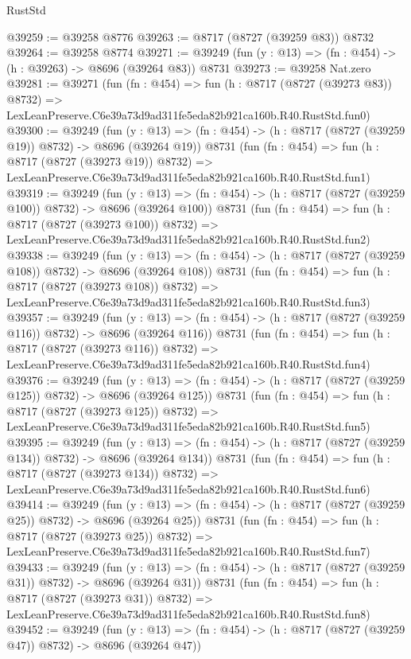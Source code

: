 \begin{lexlean}{RustStd}
\begin{coremodule}
@39259 := @39258 @8776
@39263 := @8717 (@8727 (@39259 @83)) @8732
@39264 := @39258 @8774
@39271 := @39249 (fun (y : @13) => (fn : @454) -> (h : @39263) -> @8696 (@39264 @83)) @8731
@39273 := @39258 Nat.zero
@39281 := @39271
    (fun (fn : @454) =>
    fun (h : @8717 (@8727 (@39273 @83)) @8732) =>
    LexLeanPreserve.C6e39a73d9ad311fe5eda82b921ca160b.R40.RustStd.fun0)
@39300 := @39249
    (fun (y : @13) => (fn : @454) -> (h : @8717 (@8727 (@39259 @19)) @8732) -> @8696 (@39264 @19))
    @8731
    (fun (fn : @454) =>
    fun (h : @8717 (@8727 (@39273 @19)) @8732) =>
    LexLeanPreserve.C6e39a73d9ad311fe5eda82b921ca160b.R40.RustStd.fun1)
@39319 := @39249
    (fun (y : @13) => (fn : @454) -> (h : @8717 (@8727 (@39259 @100)) @8732) -> @8696 (@39264 @100))
    @8731
    (fun (fn : @454) =>
    fun (h : @8717 (@8727 (@39273 @100)) @8732) =>
    LexLeanPreserve.C6e39a73d9ad311fe5eda82b921ca160b.R40.RustStd.fun2)
@39338 := @39249
    (fun (y : @13) => (fn : @454) -> (h : @8717 (@8727 (@39259 @108)) @8732) -> @8696 (@39264 @108))
    @8731
    (fun (fn : @454) =>
    fun (h : @8717 (@8727 (@39273 @108)) @8732) =>
    LexLeanPreserve.C6e39a73d9ad311fe5eda82b921ca160b.R40.RustStd.fun3)
@39357 := @39249
    (fun (y : @13) => (fn : @454) -> (h : @8717 (@8727 (@39259 @116)) @8732) -> @8696 (@39264 @116))
    @8731
    (fun (fn : @454) =>
    fun (h : @8717 (@8727 (@39273 @116)) @8732) =>
    LexLeanPreserve.C6e39a73d9ad311fe5eda82b921ca160b.R40.RustStd.fun4)
@39376 := @39249
    (fun (y : @13) => (fn : @454) -> (h : @8717 (@8727 (@39259 @125)) @8732) -> @8696 (@39264 @125))
    @8731
    (fun (fn : @454) =>
    fun (h : @8717 (@8727 (@39273 @125)) @8732) =>
    LexLeanPreserve.C6e39a73d9ad311fe5eda82b921ca160b.R40.RustStd.fun5)
@39395 := @39249
    (fun (y : @13) => (fn : @454) -> (h : @8717 (@8727 (@39259 @134)) @8732) -> @8696 (@39264 @134))
    @8731
    (fun (fn : @454) =>
    fun (h : @8717 (@8727 (@39273 @134)) @8732) =>
    LexLeanPreserve.C6e39a73d9ad311fe5eda82b921ca160b.R40.RustStd.fun6)
@39414 := @39249
    (fun (y : @13) => (fn : @454) -> (h : @8717 (@8727 (@39259 @25)) @8732) -> @8696 (@39264 @25))
    @8731
    (fun (fn : @454) =>
    fun (h : @8717 (@8727 (@39273 @25)) @8732) =>
    LexLeanPreserve.C6e39a73d9ad311fe5eda82b921ca160b.R40.RustStd.fun7)
@39433 := @39249
    (fun (y : @13) => (fn : @454) -> (h : @8717 (@8727 (@39259 @31)) @8732) -> @8696 (@39264 @31))
    @8731
    (fun (fn : @454) =>
    fun (h : @8717 (@8727 (@39273 @31)) @8732) =>
    LexLeanPreserve.C6e39a73d9ad311fe5eda82b921ca160b.R40.RustStd.fun8)
@39452 := @39249
    (fun (y : @13) => (fn : @454) -> (h : @8717 (@8727 (@39259 @47)) @8732) -> @8696 (@39264 @47))

\end{coremodule}
\end{lexlean}
